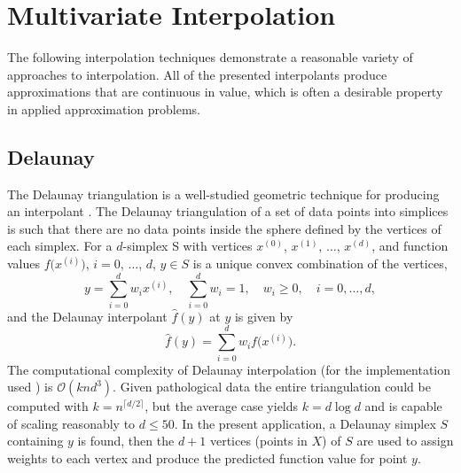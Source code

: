 \documentclass[smallextended,final]{svjour3}  %
\begin{document}
\section{Multivariate Interpolation}
\label{sec:interpolation}
The following interpolation techniques demonstrate a reasonable
variety of approaches to interpolation. All of the presented
interpolants produce approximations that are continuous in value,
which is often a desirable property in applied approximation problems.

\subsection{Delaunay}
\label{sec:delaunay}

The Delaunay triangulation is a well-studied geometric technique for
producing an interpolant \cite{lee1980two}. The Delaunay triangulation
of a set of data points into simplices is such that there are no data
points inside the sphere defined by the vertices of each simplex. For
a $d$-simplex S with vertices $x^{(0)}$, $x^{(1)}$, $\ldots$,
$x^{(d)}$, and function values $f\bigl(x^{(i)}\bigr)$, $i=0$,
$\ldots$, $d$, $y \in S$ is a unique convex combination of the
vertices,
 $$ y = \sum_{i=0}^{d} w_i x^{(i)}, \quad \sum_{i=0}^{d} w_i = 1, \quad w_i \geq 0, \quad i=0,\ldots,d, $$
and the Delaunay interpolant $\hat f(y)$ at $y$ is given by
 $$ \hat f(y) = \sum_{i=0}^{d} w_i f\bigl(x^{(i)}\bigr). $$ The
computational complexity of Delaunay interpolation (for the
implementation used \cite{chang2018polynomial}) is $\mathcal{O}(k n
d^3)$. Given pathological data the entire triangulation could be
computed with $k = n^{\lceil d / 2 \rceil}$, but the average case yields
$k = d \log d$ and is capable of scaling reasonably to $d \leq 50$. In
the present application, a Delaunay simplex $S$ containing $y$ is
found, then the $d+1$ vertices (points in $X$) of $S$ are used to
assign weights to each vertex and produce the predicted function value
for point $y$.
\end{document}
